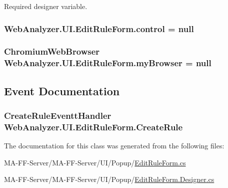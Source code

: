 Required designer variable. 

\hypertarget{class_web_analyzer_1_1_u_i_1_1_edit_rule_form_a9d1ff11c0ffd1f01406c687f6b10a873}{}
\subsubsection[{control}]{ Web\+Analyzer.\+U\+I.\+Edit\+Rule\+Form.\+control = null\hspace{0.3cm}{\ttfamily [private]}}\label{class_web_analyzer_1_1_u_i_1_1_edit_rule_form_a9d1ff11c0ffd1f01406c687f6b10a873}
\hypertarget{class_web_analyzer_1_1_u_i_1_1_edit_rule_form_a13a68bf348e8745e5ea013dc3a3f4ea6}{}
\subsubsection[{my\+Browser}]{\setlength{\rightskip}{0pt plus 5cm}Chromium\+Web\+Browser Web\+Analyzer.\+U\+I.\+Edit\+Rule\+Form.\+my\+Browser = null\hspace{0.3cm}{\ttfamily [private]}}\label{class_web_analyzer_1_1_u_i_1_1_edit_rule_form_a13a68bf348e8745e5ea013dc3a3f4ea6}


\subsection{Event Documentation}
\hypertarget{class_web_analyzer_1_1_u_i_1_1_edit_rule_form_a270cf87236a05ce56741d8df75a16a0c}{}
\subsubsection[{Create\+Rule}]{\setlength{\rightskip}{0pt plus 5cm}Create\+Rule\+Eventt\+Handler Web\+Analyzer.\+U\+I.\+Edit\+Rule\+Form.\+Create\+Rule}\label{class_web_analyzer_1_1_u_i_1_1_edit_rule_form_a270cf87236a05ce56741d8df75a16a0c}


The documentation for this class was generated from the following files\+:\begin{DoxyCompactItemize}
\item 
M\+A-\/\+F\+F-\/\+Server/\+M\+A-\/\+F\+F-\/\+Server/\+U\+I/\+Popup/\hyperlink{_edit_rule_form_8cs}{Edit\+Rule\+Form.\+cs}\item 
M\+A-\/\+F\+F-\/\+Server/\+M\+A-\/\+F\+F-\/\+Server/\+U\+I/\+Popup/\hyperlink{_edit_rule_form_8_designer_8cs}{Edit\+Rule\+Form.\+Designer.\+cs}\end{DoxyCompactItemize}
